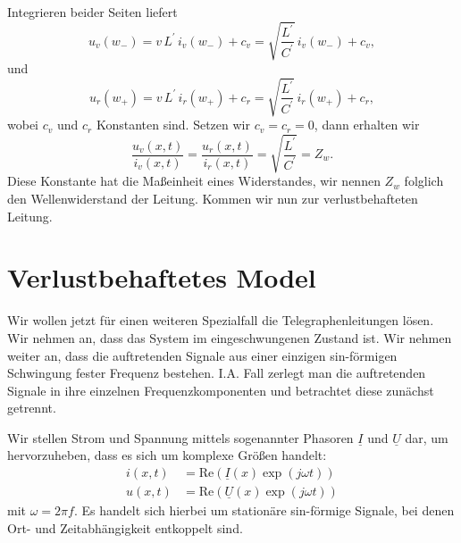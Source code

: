 \documentclass[paper=a4, parskip=half-, ngerman, fontsize=11pt]{scrreprt}
\begin{document}
Integrieren beider Seiten liefert
\begin{equation}
    u_{v}(w_{-}) = v \, L^{\prime} \, i_{v}(w_{-}) + c_{v} = \sqrt{\frac{L^{\prime}}{C^{\prime}}} \, i_{v}(w_{-}) +
    c_{v},
\end{equation}
und
\begin{equation}
    u_{r}(w_{+}) = v \, L^{\prime} \, i_{r}(w_{+}) + c_{r} = \sqrt{\frac{L^{\prime}}{C^{\prime}}} \, i_{r}(w_{+}) +
    c_{r},
\end{equation}
wobei $c_{v}$ und $c_{r}$ Konstanten sind. Setzen wir $c_{v} = c_{r} = 0$, dann erhalten wir
\begin{equation}
    \frac{u_{v}(x, t)}{i_{v}(x, t)} = \frac{u_{r}(x, t)}{i_{r}(x, t)} = \sqrt{\frac{L^{\prime}}{C^{\prime}}} = Z_{w}.
\end{equation}
Diese Konstante hat die Maßeinheit eines Widerstandes, wir nennen $Z_{w}$ folglich den Wellenwiderstand der Leitung.
Kommen wir nun zur verlustbehafteten Leitung.

\section{Verlustbehaftetes Model}
Wir wollen jetzt für einen weiteren Spezialfall die Telegraphenleitungen lösen. Wir nehmen an, dass das System im
eingeschwungenen Zustand ist. Wir nehmen weiter an, dass die auftretenden Signale aus einer einzigen sin-förmigen
Schwingung fester Frequenz bestehen. I.A. Fall zerlegt man die auftretenden Signale in ihre einzelnen
Frequenzkomponenten und betrachtet diese zunächst getrennt.

Wir stellen Strom und Spannung mittels sogenannter Phasoren $\underline{I}$ und $\underline{U}$ dar, um hervorzuheben,
dass es sich um komplexe Größen handelt:
\begin{align*}
    i(x, t) &= \mathrm{Re} \left( \underline{I}(x) \exp(j \omega t) \right) \\
    u(x, t) &= \mathrm{Re} \left( \underline{U}(x) \exp(j \omega t) \right)
\end{align*}
mit $\omega = 2 \pi f$. Es handelt sich hierbei um stationäre sin-förmige Signale, bei denen Ort- und Zeitabhängigkeit
entkoppelt sind.
\end{document}
